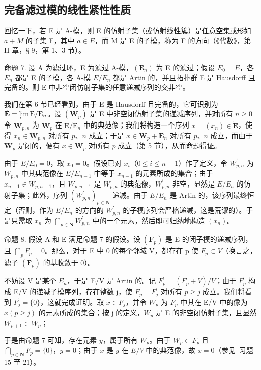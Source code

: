 \subsection{完备滤过模的线性紧性性质}

回忆一下，若 E 是 A-模，则 E 的仿射子集（或仿射线性簇）是任意空集或形如 \(a + M\) 的子集 F，其中 \(a \in E\)，而 M 是 E 的子模，称为 F 的方向（《代数》，第 II 章，§ 9，第 1、3 节）。

命题 7. 设 A 为滤过环，E 为滤过 A-模，\((\mathbf{E}_{n})\) 为 E 的滤过；假设 \(E_{0} = E\)，各 \(E_{n}\) 都是 E 的子模，各 A-模 \(E/E_{n}\) 都是 Artin 的，并且拓扑群 E 是 Hausdorff 且完备的。则 E 中非空闭仿射子集的任意递减序列的交非空。

	我们在第 6 节已经看到，由于 E 是 Hausdorff 且完备的，它可识别为 \(\tilde{\mathbf{E}} = \varprojlim \mathrm{E} / \mathrm{E}_n\)。设 \((\mathbf{W}_p)\) 是 E 中非空闭仿射子集的递减序列，并对所有 \(n \geqslant 0\) 令 \(\mathbf{W}_{p,n}\) 为 \(\mathbf{W}_p\) 在 \(\mathrm{E} / \mathrm{E}_n\) 中的典范像；我们将构造一个序列 \(x = (x_n) \in \tilde{\mathbf{E}}\)，使得 \(x_n \in \mathbf{W}_{p,n}\) 对所有 \(p\)、\(n\) 成立；于是 \(x \in \mathbf{W}_p + \mathbf{E}_n\) 对所有 \(p\)、\(n\) 成立，而由于 \(\mathbf{W}_p\) 是闭的，便有 \(x \in \mathbf{W}_p\) 对所有 \(p\) 成立（第 5 节），从而命题得证。

	由于 \(E/E_{0}=0\)，取 \(x_{0}=0\)。假设已对 \(x_{i}\)（\(0\leqslant i\leqslant n-1\)）作了定义，令 \(W_{p,n}^{\prime}\) 为 \(W_{p,n}\) 中其典范像在 \(E/E_{n-1}\) 中等于 \(x_{n-1}\) 的元素所成的集合；由于 \(x_{n-1}\in W_{p,n-1}\)，且 \(W_{p,n-1}\) 是 \(W_{p,n}\) 的典范像，\(W_{p,n}^{\prime}\) 非空，显然是 \(E/E_{n}\) 的仿射子集；此外，序列 \((W_{p,n}^{\prime})_{p\in\mathbf{N}}\) 递减。由于 \(E/E_{n}\) 是 Artin 的，该序列最终恒定（否则，作为 \(E/E_{n}\) 的方向的 \(W_{p,n}^{\prime}\) 的子模序列会严格递减，这是荒谬的）。于是只需取 \(x_{n}\) 为 \(\bigcap_{p\in\mathbf{N}}W_{p,n}^{\prime}\) 中的一个元素，然后即可归纳地构造 \((x_{n})\)。

命题 8. 假设 A 和 E 满足命题 7 的假设。设 \((\mathbf{F}_{p})\) 是 E 的闭子模的递减序列，且 \(\bigcap_{p} F_{p} = 0\)。那么，对于 E 中 0 的每个邻域 V，都存在 p 使 \(F_{p} \subset V\)（换言之，滤子 \((\mathbf{F}_{p})\) 的基收敛于 0）。

	不妨设 V 是某个 \(E_{n}\)，于是 E/V 是 Artin 的。记 \(F_{p}^{\prime} = (F_{p} + V)/V\)；由于 \(F_{p}^{\prime}\) 构成 E/V 的递减子模序列，存在整数 j，使 \(F_{p}^{\prime} = F_{j}^{\prime}\) 对所有 \(p \geqslant j\) 成立。我们将看到 \(F_{j}^{\prime} = \{0\}\)，这就完成证明。取 \(x \in F_{j}^{\prime}\)，并令 \(W_{p}\) 为 \(F_{p}\) 中其在 E/V 中的像为 \(x (p \geqslant j)\) 的元素所成的集合；按 j 的定义，\(W_{p}\) 是 E 的非空闭仿射子集，且显然 \(W_{p+1} \subset W_{p}\)；

于是由命题 7 可知，存在元素 \(y\)，属于所有 \(W_p\)。由于 \(W_p \subset F_p\) 且 \(\bigcap_{p \in \mathbf{N}} F_p = \{0\}\)，\(y = 0\)；由于 \(x\) 是 \(y\) 在 \(E / V\) 中的典范像，故 \(x = 0\)（参见~习题 15 至 21）。

